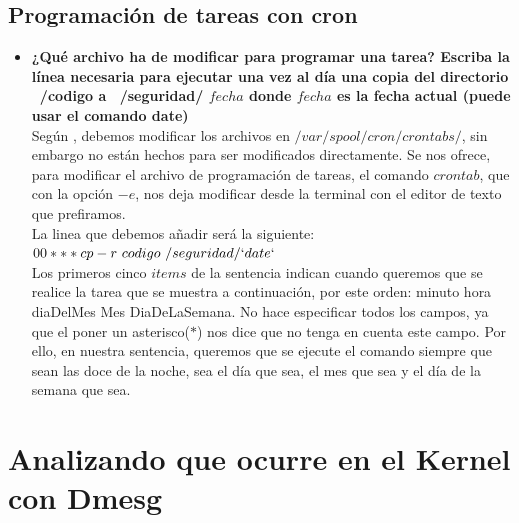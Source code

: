 \subsection{Programación de tareas con cron}
\begin{itemize}
	\item \textbf{¿Qué archivo ha de modificar para programar una tarea? Escriba la línea
		necesaria para ejecutar una vez al día una copia del directorio ~/codigo a ~/seguridad/
		$fecha$ donde $fecha$ es la fecha actual (puede usar el comando date)}\\
	Según \cite{crontab}, debemos modificar los archivos en $/var/spool/cron/crontabs/$, sin embargo no están hechos para ser modificados directamente. Se nos ofrece, para modificar el archivo de programación de tareas, el comando $crontab$, que con la opción $-e$, nos deja modificar desde la terminal con el editor de texto que prefiramos.\\
	
	La linea que debemos añadir será la siguiente:\\
	
	$0 0 * * * cp -r ~codigo ~/seguridad/`date`$\\
	
	Los primeros cinco $items$ de la sentencia indican cuando queremos que se realice la tarea que se muestra a continuación, por este orden: minuto hora diaDelMes Mes DiaDeLaSemana. No hace especificar todos los campos, ya que el poner un asterisco($*$) nos dice que no tenga en cuenta este campo. Por ello, en nuestra sentencia, queremos que se ejecute el comando siempre que sean las doce de la noche, sea el día que sea, el mes que sea y el día de la semana que sea.
\end{itemize}

\section{Analizando que ocurre en el Kernel con Dmesg}

